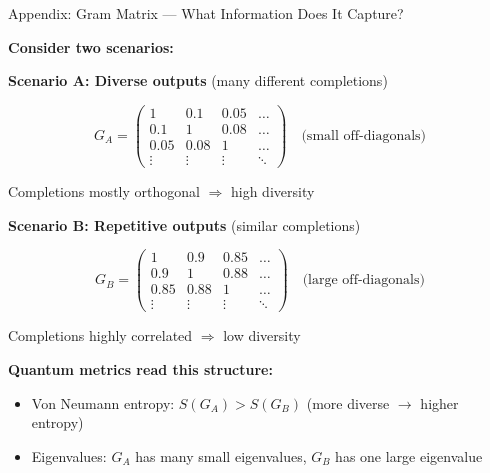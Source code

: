 \documentclass[aspectratio=169,11pt]{beamer}
\begin{document}
\begin{frame}{Appendix: Gram Matrix — What Information Does It Capture?}

\textbf{Consider two scenarios:}

\vspace{0.5em}

\textbf{Scenario A: Diverse outputs} (many different completions)

$$G_A = \begin{pmatrix}
1 & 0.1 & 0.05 & \ldots \\
0.1 & 1 & 0.08 & \ldots \\
0.05 & 0.08 & 1 & \ldots \\
\vdots & \vdots & \vdots & \ddots
\end{pmatrix} \quad \text{(small off-diagonals)}$$

Completions mostly orthogonal $\Rightarrow$ high diversity

\vspace{0.5em}

\textbf{Scenario B: Repetitive outputs} (similar completions)

$$G_B = \begin{pmatrix}
1 & 0.9 & 0.85 & \ldots \\
0.9 & 1 & 0.88 & \ldots \\
0.85 & 0.88 & 1 & \ldots \\
\vdots & \vdots & \vdots & \ddots
\end{pmatrix} \quad \text{(large off-diagonals)}$$

Completions highly correlated $\Rightarrow$ low diversity

\vspace{0.5em}

\textbf{Quantum metrics read this structure:}
\begin{itemize}
  \item Von Neumann entropy: $S(G_A) > S(G_B)$ (more diverse $\to$ higher entropy)
  \item Eigenvalues: $G_A$ has many small eigenvalues, $G_B$ has one large eigenvalue
\end{itemize}

\end{frame}
\end{document}
